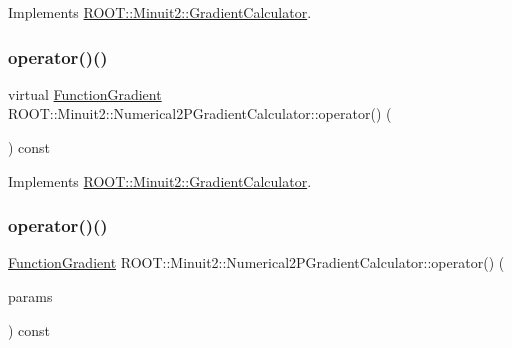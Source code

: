 Implements \mbox{\hyperlink{classROOT_1_1Minuit2_1_1GradientCalculator_a1bae913e96ffc9ece28664a5f6f79cb0}{R\+O\+O\+T\+::\+Minuit2\+::\+Gradient\+Calculator}}.

\mbox{\label{classROOT_1_1Minuit2_1_1Numerical2PGradientCalculator_a8c90cd467631ecc4cac72187de948b05}} 
\subsubsection{\texorpdfstring{operator()()}{operator()()}\hspace{0.1cm}{\footnotesize\ttfamily [3/9]}}
{\footnotesize\ttfamily virtual \mbox{\hyperlink{classROOT_1_1Minuit2_1_1FunctionGradient}{Function\+Gradient}} R\+O\+O\+T\+::\+Minuit2\+::\+Numerical2\+P\+Gradient\+Calculator\+::operator() (\begin{DoxyParamCaption}\item[{const \mbox{\hyperlink{classROOT_1_1Minuit2_1_1MinimumParameters}{Minimum\+Parameters}} \&}]{ }\end{DoxyParamCaption}) const\hspace{0.3cm}{\ttfamily [virtual]}}



Implements \mbox{\hyperlink{classROOT_1_1Minuit2_1_1GradientCalculator_a1bae913e96ffc9ece28664a5f6f79cb0}{R\+O\+O\+T\+::\+Minuit2\+::\+Gradient\+Calculator}}.

\mbox{\label{classROOT_1_1Minuit2_1_1Numerical2PGradientCalculator_ae0501810e548a264aa74855d586b0d13}} 
\subsubsection{\texorpdfstring{operator()()}{operator()()}\hspace{0.1cm}{\footnotesize\ttfamily [4/9]}}
{\footnotesize\ttfamily \mbox{\hyperlink{classROOT_1_1Minuit2_1_1FunctionGradient}{Function\+Gradient}} R\+O\+O\+T\+::\+Minuit2\+::\+Numerical2\+P\+Gradient\+Calculator\+::operator() (\begin{DoxyParamCaption}\item[{const std\+::vector$<$ double $>$ \&}]{params }\end{DoxyParamCaption}) const\hspace{0.3cm}{\ttfamily [virtual]}}

